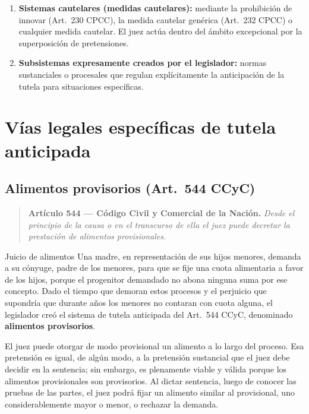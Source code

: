 \documentclass[12pt,oneside]{book}
\begin{document}
\begin{enumerate}
    \item \textbf{Sistemas cautelares (medidas cautelares):} mediante la prohibición de innovar (Art.~230 CPCC), la medida cautelar genérica (Art.~232 CPCC) o cualquier medida cautelar. El juez actúa dentro del ámbito excepcional por la superposición de pretensiones.
    \item \textbf{Subsistemas expresamente creados por el legislador:} normas sustanciales o procesales que regulan explícitamente la anticipación de la tutela para situaciones específicas.
\end{enumerate}

\section{Vías legales específicas de tutela anticipada}

\subsection{Alimentos provisorios (Art.~544 CCyC)}

\begin{quote}
\small
\textbf{Artículo 544 --- Código Civil y Comercial de la Nación.} \textit{Desde el principio de la causa o en el transcurso de ella el juez puede decretar la prestación de alimentos provisionales.}
\end{quote}

\begin{example}{Juicio de alimentos}
Una madre, en representación de sus hijos menores, demanda a su cónyuge, padre de los menores, para que se fije una cuota alimentaria a favor de los hijos, porque el progenitor demandado no abona ninguna suma por ese concepto. Dado el tiempo que demoran estos procesos y el perjuicio que supondría que durante años los menores no contaran con cuota alguna, el legislador creó el sistema de tutela anticipada del Art.~544 CCyC, denominado \textbf{alimentos provisorios}.

El juez puede otorgar de modo provisional un alimento a lo largo del proceso. Esa pretensión es igual, de algún modo, a la pretensión sustancial que el juez debe decidir en la sentencia; sin embargo, es plenamente viable y válida porque los alimentos provisionales son provisorios. Al dictar sentencia, luego de conocer las pruebas de las partes, el juez podrá fijar un alimento similar al provisional, uno considerablemente mayor o menor, o rechazar la demanda.
\end{example}
\end{document}
